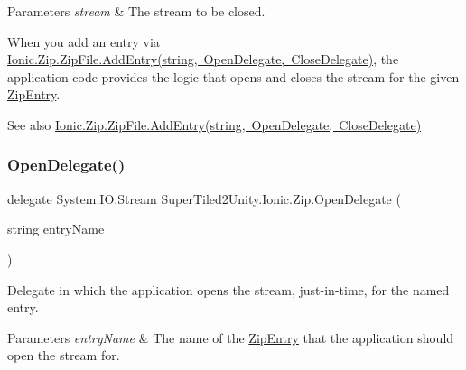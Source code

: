 \begin{DoxyParams}{Parameters}
{\em stream} & The stream to be closed.\\
\hline
\end{DoxyParams}


When you add an entry via \mbox{\hyperlink{class_super_tiled2_unity_1_1_ionic_1_1_zip_1_1_zip_file_aca70604c3928ce13d5028d31b7d491fd}{Ionic.\+Zip.\+Zip\+File.\+Add\+Entry(string,
  Open\+Delegate, Close\+Delegate)}}, the application code provides the logic that opens and closes the stream for the given \mbox{\hyperlink{class_super_tiled2_unity_1_1_ionic_1_1_zip_1_1_zip_entry}{Zip\+Entry}}. 

\begin{DoxySeeAlso}{See also}
\mbox{\hyperlink{class_super_tiled2_unity_1_1_ionic_1_1_zip_1_1_zip_file_aca70604c3928ce13d5028d31b7d491fd}{Ionic.\+Zip.\+Zip\+File.\+Add\+Entry(string, Open\+Delegate, Close\+Delegate)}}


\end{DoxySeeAlso}
\mbox{\label{namespace_super_tiled2_unity_1_1_ionic_1_1_zip_a02583f9b7b1b724562c5ead6715256f2}} 
\subsubsection{\texorpdfstring{Open\+Delegate()}{OpenDelegate()}}
{\footnotesize\ttfamily delegate System.\+I\+O.\+Stream Super\+Tiled2\+Unity.\+Ionic.\+Zip.\+Open\+Delegate (\begin{DoxyParamCaption}\item[{string}]{entry\+Name }\end{DoxyParamCaption})}



Delegate in which the application opens the stream, just-\/in-\/time, for the named entry. 


\begin{DoxyParams}{Parameters}
{\em entry\+Name} & The name of the \mbox{\hyperlink{class_super_tiled2_unity_1_1_ionic_1_1_zip_1_1_zip_entry}{Zip\+Entry}} that the application should open the stream for. \\
\hline
\end{DoxyParams}


